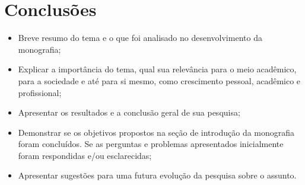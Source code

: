 \chapter{Conclusões}\label{chp:conc}

\begin{itemize}
    \item Breve resumo do tema e o que foi analisado no desenvolvimento da monografia;
    \item Explicar a importância do tema, qual sua relevância para o meio acadêmico, para a sociedade e até para si mesmo, como crescimento pessoal, acadêmico e profissional;
    \item Apresentar os resultados e a conclusão geral de sua pesquisa;
    \item Demonstrar se os objetivos propostos na seção de introdução da monografia foram concluídos. Se as perguntas e problemas apresentados inicialmente foram respondidas e/ou esclarecidas;
    \item Apresentar sugestões para uma futura evolução da pesquisa sobre o assunto.
\end{itemize}
